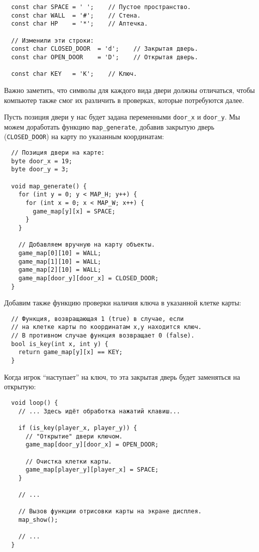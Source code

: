 \documentclass[../sparc.tex]{subfiles}
\begin{document}
\begin{verbatim}
  const char SPACE = ' ';    // Пустое пространство.
  const char WALL  = '#';    // Стена.
  const char HP    = '*';    // Аптечка.

  // Изменили эти строки:
  const char CLOSED_DOOR  = 'd';    // Закрытая дверь.
  const char OPEN_DOOR    = 'D';    // Открытая дверь.

  const char KEY   = 'K';    // Ключ.
\end{verbatim}

Важно заметить, что символы для каждого вида двери должны отличаться, чтобы
компьютер также смог их различить в проверках, которые потребуются далее.

Пусть позиция двери у нас будет задана переменными \texttt{door\_x} и
\texttt{door\_y}.  Мы можем доработать функцию \texttt{map\_generate}, добавив
закрытую дверь (\texttt{CLOSED\_DOOR}) на карту по указанным координатам:

\begin{verbatim}
  // Позиция двери на карте:
  byte door_x = 19;
  byte door_y = 3;

  void map_generate() {
    for (int y = 0; y < MAP_H; y++) {
      for (int x = 0; x < MAP_W; x++) {
        game_map[y][x] = SPACE;
      }
    }

    // Добавляем вручную на карту объекты.
    game_map[0][10] = WALL;
    game_map[1][10] = WALL;
    game_map[2][10] = WALL;
    game_map[door_y][door_x] = CLOSED_DOOR;
  }
\end{verbatim}

Добавим также функцию проверки наличия ключа в указанной клетке карты:

\begin{verbatim}
  // Функция, возвращающая 1 (true) в случае, если
  // на клетке карты по координатам x,y находится ключ.
  // В противном случае функция возвращает 0 (false).
  bool is_key(int x, int y) {
    return game_map[y][x] == KEY;
  }
\end{verbatim}

Когда игрок ``наступает'' на ключ, то эта закрытая дверь будет заменяться на
открытую:

\begin{verbatim}
  void loop() {
    // ... Здесь идёт обработка нажатий клавиш...

    if (is_key(player_x, player_y)) {
      // "Открытие" двери ключом.
      game_map[door_y][door_x] = OPEN_DOOR;

      // Очистка клетки карты.
      game_map[player_y][player_x] = SPACE;
    }

    // ...

    // Вызов функции отрисовки карты на экране дисплея.
    map_show();

    // ...
  }
\end{verbatim}
\end{document}

